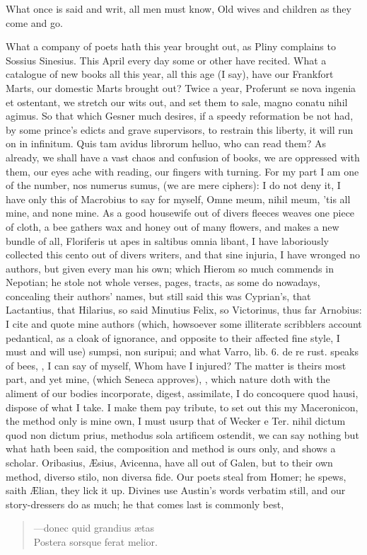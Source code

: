 {What once is said and writ, all men must know,
Old wives and children as they come and go.

What a company of poets hath this year brought out, as Pliny complains
to Sossius Sinesius. This April every day some or other have
recited. What a catalogue of new books all this year, all this age (I
say), have our Frankfort Marts, our domestic Marts brought out? Twice a
year,  Proferunt se nova ingenia et ostentant, we stretch our wits
out, and set them to sale, magno conatu nihil agimus. So that which
Gesner much desires, if a speedy reformation be not had, by some
prince's edicts and grave supervisors, to restrain this liberty, it
will run on in infinitum. Quis tam avidus librorum helluo, who can read
them? As already, we shall have a vast chaos and confusion of books, we
are oppressed with them, our eyes ache with reading, our
fingers with turning. For my part I am one of the number, nos numerus
sumus, (we are mere ciphers): I do not deny it, I have only this of
Macrobius to say for myself, Omne meum, nihil meum, 'tis all mine, and
none mine. As a good housewife out of divers fleeces weaves one piece
of cloth, a bee gathers wax and honey out of many flowers, and makes a
new bundle of all, \textlatin{Floriferis ut apes in saltibus omnia libant}, I have
laboriously collected this cento out of divers writers, and that
sine injuria, I have wronged no authors, but given every man his own;
which Hierom so much commends in Nepotian; he stole not whole
verses, pages, tracts, as some do nowadays, concealing their authors'
names, but still said this was Cyprian's, that Lactantius, that
Hilarius, so said Minutius Felix, so Victorinus, thus far Arnobius: I
cite and quote mine authors (which, howsoever some illiterate
scribblers account pedantical, as a cloak of ignorance, and opposite to
their affected fine style, I must and will use) sumpsi, non suripui;
and what Varro, lib. 6. de re rust. speaks of bees, , I can say of myself, Whom
have I injured? The matter is theirs most part, and yet mine,  (which Seneca approves), , which nature doth with the aliment of our bodies
incorporate, digest, assimilate, I do concoquere quod hausi, dispose of
what I take. I make them pay tribute, to set out this my Maceronicon,
the method only is mine own, I must usurp that of Wecker e Ter.
nihil dictum quod non dictum prius, methodus sola artificem ostendit,
we can say nothing but what hath been said, the composition and method
is ours only, and shows a scholar. Oribasius, \AE{}sius, Avicenna, have
all out of Galen, but to their own method, diverso stilo, non diversa
fide. Our poets steal from Homer; he spews, saith \AE{}lian, they lick it
up. Divines use Austin's words verbatim still, and our story-dressers
do as much; he that comes last is commonly best,
\begin{verse}
---\textlatin{donec quid grandius \ae{}tas}\\
\textlatin{Postera sorsque ferat melior}.
\end{verse}

}
